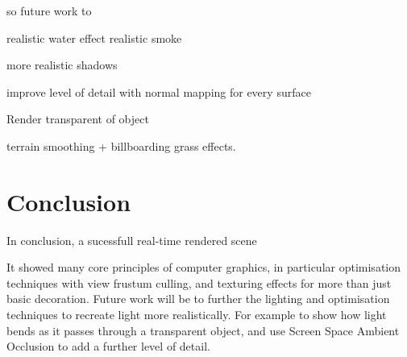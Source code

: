 \documentclass[conference]{acmsiggraph}
\begin{document}
so future work to 

realistic water effect
realistic smoke

more realistic shadows

improve level of detail with normal mapping for every surface


Render transparent of object 

terrain smoothing + billboarding grass effects.




	
\section{Conclusion}
In conclusion, a sucessfull real-time rendered scene 

It showed many core principles of computer graphics, in particular optimisation techniques with view frustum culling, and texturing effects for more than just basic decoration. Future work will be to further the lighting and optimisation techniques to recreate light more realistically. For example to show how light bends as it passes through a transparent object, and use Screen Space Ambient Occlusion to add a further level of detail.


	
	
\end{document}
